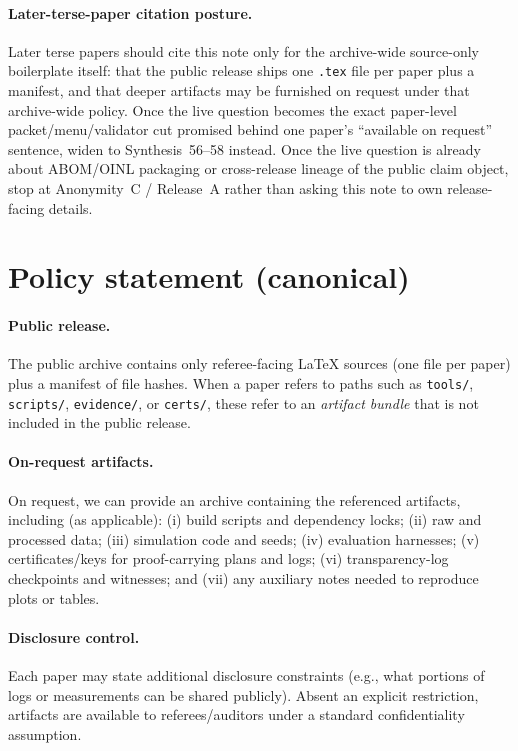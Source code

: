 \documentclass[11pt]{article}
\begin{document}
\paragraph{Later-terse-paper citation posture.}
Later terse papers should cite this note only for the archive-wide source-only boilerplate itself: that the public release ships one \texttt{.tex} file per paper plus a manifest, and that deeper artifacts may be furnished on request under that archive-wide policy. Once the live question becomes the exact paper-level packet/menu/validator cut promised behind one paper's ``available on request'' sentence, widen to Synthesis~56--58 instead. Once the live question is already about ABOM/OINL packaging or cross-release lineage of the public claim object, stop at Anonymity~C / Release~A rather than asking this note to own release-facing details.\cite{series:publicrequestcontracts,series:requestableevidenceclasses,series:requestfulfillmentcertificates,series:abomoinl,series:releaseproperty}



\section{Policy statement (canonical)}
\paragraph{Public release.}
The public archive contains only referee-facing \LaTeX{} sources (one file per paper) plus a manifest of file hashes.
When a paper refers to paths such as \texttt{tools/}, \texttt{scripts/}, \texttt{evidence/}, or \texttt{certs/}, these refer to an \emph{artifact bundle}
that is not included in the public release.

\paragraph{On-request artifacts.}
On request, we can provide an archive containing the referenced artifacts, including (as applicable):
(i) build scripts and dependency locks;
(ii) raw and processed data;
(iii) simulation code and seeds;
(iv) evaluation harnesses;
(v) certificates/keys for proof-carrying plans and logs;
(vi) transparency-log checkpoints and witnesses; and
(vii) any auxiliary notes needed to reproduce plots or tables.

\paragraph{Disclosure control.}
Each paper may state additional disclosure constraints (e.g., what portions of logs or measurements can be shared publicly).
Absent an explicit restriction, artifacts are available to referees/auditors under a standard confidentiality assumption.
\end{document}
